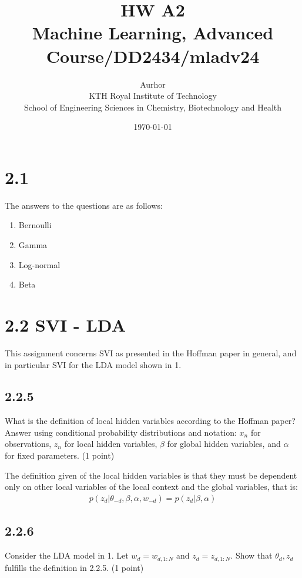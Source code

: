 \documentclass{article}
\title{HW A2\\\Large{Machine Learning, Advanced Course/DD2434/mladv24}}
\author{Aurhor \\ KTH Royal Institute of Technology\\ School of Engineering Sciences in Chemistry, Biotechnology and Health}
\date{\today}
\begin{document}
\maketitle

\fancyfoot[C]{\thepage}
\begin{multicols}{2}

    \section*{2.1}
    The answers to the questions are as follows:
    \begin{enumerate}[noitemsep, topsep=0pt]
        \item Bernoulli
        \item Gamma
        \item Log-normal
        \item Beta
    \end{enumerate}
\section*{2.2 SVI - LDA}

This assignment concerns SVI as presented in the Hoffman paper in general, and in particular SVI for the LDA model shown in 1.

\subsection*{2.2.5} 
What is the definition of local hidden variables according to the Hoffman paper? Answer using conditional probability distributions and notation: \(x_n\) for observations, \(z_n\) for local hidden variables, \(\beta\) for global hidden variables, and \(\alpha\) for fixed parameters. (1 point) \bigskip

The definition given of the local hidden variables is that they must be dependent only on other local variables of the local context and the global variables, that is:
\begin{align}
    p(z_{d}|\theta_{-d}, \beta, \alpha, w_{-d}) = p(z_{d} | \beta, \alpha)
\end{align}
\subsection*{2.2.6}
Consider the LDA model in 1. Let \(w_d = w_{d,1:N}\) and \(z_d = z_{d,1:N}\). Show that \(\theta_d, z_d\) fulfills the definition in 2.2.5. (1 point)\bigskip


\end{multicols}
\end{document}
